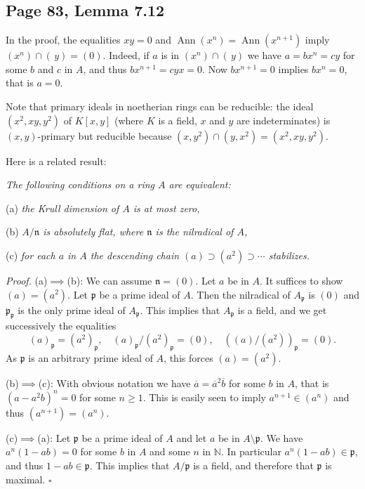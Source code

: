 \documentclass[parskip=half,fontsize=12pt]{scrartcl}%
\newcommand{\oo}{\operatorname}\newcommand{\ooo}{\operatorname*}
\newcommand{\mf}{\mathfrak}
\newcommand{\nnn}{\mf n}
\newcommand{\ppp}{\mf p}
\begin{document}
\subsection{Page 83, Lemma 7.12}%

In the proof, the equalities $xy=0$ and $\oo{Ann}(x^n)=\oo{Ann}(x^{n+1})$ imply $(x^n)\cap(\,y)=(0)$. Indeed, if $a$ is in $(x^n)\cap(\,y)$ we have $a=bx^n=cy$ for some $b$ and $c$ in $A$, and thus $bx^{n+1}=cyx=0$. Now $bx^{n+1}=0$ implies $bx^n=0$, that is $a=0$. 

Note that primary ideals in noetherian rings can be reducible: the ideal $(x^2,xy,y^2)$ of $K[x,y]$ (where $K$ is a field, $x$ and $y$ are indeterminates) is $(x,y)$-primary but reducible because $(x,y^2)\cap(y,x^2)=(x^2,xy,y^2)$. 


Here is a related result:

\emph{The following conditions on a ring $A$ are equivalent:}

(a) \emph{the Krull dimension of $A$ is at most zero,}

(b) \emph{$A/\nnn$ is absolutely flat, where $\nnn$ is the nilradical of $A$,}

(c) \emph{for each $a$ in $A$ the descending chain $(a)\supset(a^2)\supset\cdots$ stabilizes.}

\emph{Proof.} (a)$\implies$(b): We can assume $\nnn=(0)$. Let $a$ be in $A$. It suffices to show $(a)=(a^2)$. Let $\ppp$ be a prime ideal of $A$. Then the nilradical of $A_\ppp$ is $(0)$ and $\ppp_\ppp$ is the only prime ideal of $A_\ppp$. This implies that $A_\ppp$ is a field, and we get successively the equalities 
$$
(a)_\ppp=(a^2)_\ppp,\quad(a)_\ppp/(a^2)_\ppp=(0),\quad((a)/(a^2))_\ppp=(0).
$$ 
As $\ppp$ is an arbitrary prime ideal of $A$, this forces $(a)=(a^2)$.

(b)$\implies$(c): With obvious notation we have $\overline a=\overline a^2\overline b$ for some $b$ in $A$, that is $(a-a^2b)^n=0$ for some $n\ge1$. This is easily seen to imply $a^{n+1}\in(a^n)$ and thus $(a^{n+1})=(a^n)$. 

(c)$\implies$(a): Let $\ppp$ be a prime ideal of $A$ and let $a$ be in $A\setminus\ppp$. We have $a^n(1-ab)=0$ for some $b$ in $A$ and some $n$ in $\mathbb N$. In particular $a^n(1-ab)\in\ppp$, and thus $1-ab\in\ppp$. This implies that $A/\ppp$ is a field, and therefore that $\ppp$ is maximal. $\square$
\end{document}
